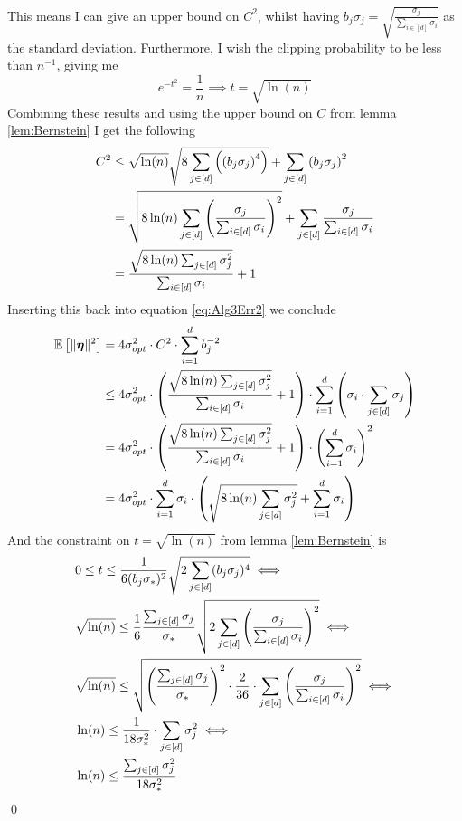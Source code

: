 \documentclass[a4paper,12pt]{article}
\renewenvironment{proof}{{\textit{Proof} \\}}{\qed}
\begin{document}
\begin{proof}
This means I can give an upper bound on $C^2$, whilst having
$b_j \sigma_j = \sqrt{\frac{\sigma_j}{\sum_{i \in [d]} \sigma_i}}$ 
as the standard deviation.
Furthermore, I wish the clipping probability to be less than $n^{-1}$, giving me
\[
    e^{-t^2} = \frac{1}{n} \implies t = \sqrt{\ln (n)}
\]
Combining these results and using the upper bound on $C$ from lemma \ref{lem:Bernstein} I get the following
\begin{align*}
    C^2 &\le \sqrt{\ln(n)} \sqrt{8\sum_{j \in [d]}  \left (\left (b_j\sigma_j\right)^4\right)} + 
    \sum_{j \in [d]} \left (b_j\sigma_j\right)^2 \\
    &=\sqrt{8 \ln(n) \sum_{j \in [d]} \left (\frac{\sigma_j}{\sum_{i \in [d]} \sigma_i}\right)^2} + 
    \sum_{j \in [d]} \frac{\sigma_j}{\sum_{i \in [d]} \sigma_i} \\
    &=\frac{\sqrt{8 \ln(n) \sum_{j \in [d]} \sigma_j^2}}{\sum_{i \in [d]} \sigma_i}
    + 1
\end{align*}
Inserting this back into equation \eqref{eq:Alg3Err2} we conclude
\begin{align*}
    \mathbb{E} \left [ \| \bm{\eta} \|^2 \right] &= 4\sigma_{opt}^2 \cdot 
    C^2 \cdot \sum_{i=1}^d b_j^{-2} \\
    &\le 4\sigma_{opt}^2 \cdot 
    \left (\frac{\sqrt{8 \ln(n) \sum_{j \in [d]} \sigma_j^2}}{\sum_{i \in [d]} \sigma_i}
    + 1\right) \cdot \sum_{i=1}^d \left (\sigma_i \cdot \sum_{j \in [d]} \sigma_j\right) \\
    &= 4\sigma_{opt}^2 \cdot 
    \left (\frac{\sqrt{8 \ln(n) \sum_{j \in [d]} \sigma_j^2}}{\sum_{i \in [d]} \sigma_i}
    + 1\right) \cdot \left (\sum_{i=1}^d \sigma_i\right)^2 \\
    &= 4\sigma_{opt}^2 \cdot \sum_{i=1}^d \sigma_i \cdot 
    \left (\sqrt{8 \ln(n) \sum_{j \in [d]} \sigma_j^2}
    + \sum_{i=1}^d \sigma_i\right)
\end{align*}
And the constraint on $t = \sqrt{\ln (n)}$ from lemma \ref{lem:Bernstein} is
\begin{align*}
    &0 \le t \le \frac{1}{6 (b_j\sigma_*)^2} \sqrt{2\sum_{j \in [d]} (b_j\sigma_j)^4} \iff \\
    &\sqrt{\ln (n)} \le \frac{1}{6} \frac{\sum_{j \in [d]} \sigma_j}{\sigma_*} \sqrt{2\sum_{j \in [d]} \left (\frac{\sigma_j}{\sum_{i \in [d]} \sigma_i}\right)^2} \iff \\
    &\sqrt{\ln (n)} \le \sqrt{\left (\frac{\sum_{j \in [d]} \sigma_j}{\sigma_*}\right)^2 \cdot \frac{2}{36} \cdot \sum_{j \in [d]} \left (\frac{\sigma_j}{\sum_{i \in [d]} \sigma_i}\right)^2} \iff \\
    &\ln (n) \le \frac{1}{18\sigma_*^2} \cdot \sum_{j \in [d]} \sigma_j^2 \iff \\
    &\ln (n) \le \frac{\sum_{j \in [d]} \sigma_j^2}{18 \sigma_*^2}
\end{align*}
\end{proof}
\end{document}
